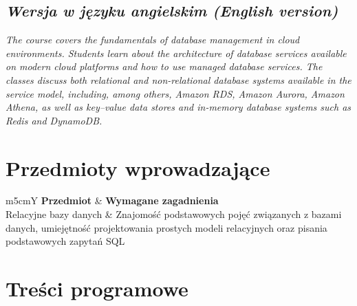\documentclass[12pt, a4paper]{article}
\newcommand{\thdrule}{\noalign{\global\setlength{\extrarowheight}{0pt}}}
\newcommand{\thdend}{\noalign{\global\setlength{\extrarowheight}{3pt}}}
\begin{document}
\subsection*{\textit{Wersja w języku angielskim (English version)}}

\textit{The course covers the fundamentals of database management in cloud environments. Students learn about the architecture of database services available on modern cloud platforms and how to use managed database services. The classes discuss both relational and non-relational database systems available in the service model, including, among others, Amazon RDS, Amazon Aurora, Amazon Athena, as well as key–value data stores and in-memory database systems such as Redis and DynamoDB.}


\section{Przedmioty wprowadzające}

{\scriptsize
\begin{tabularx}{\textwidth}{m{5cm}Y}
\thdrule\toprule
{} {\color{white}\textbf{Przedmiot}} & {\color{white}\textbf{Wymagane zagadnienia}} \\
\midrule\thdend
   Relacyjne bazy danych & Znajomość podstawowych pojęć związanych z bazami danych, umiejętność projektowania prostych modeli relacyjnych oraz pisania podstawowych zapytań SQL \\
\bottomrule
\end{tabularx}}

\section{Treści programowe}
\end{document}
